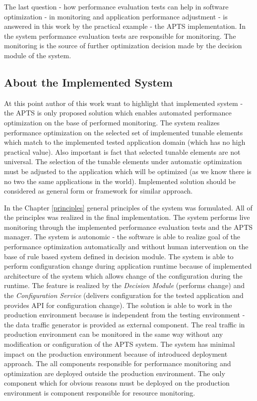 \documentclass[12pt,a4paper]{article}
\begin{document}
The last question - how performance evaluation tests can help in software optimization - in monitoring and application performance adjustment - is answered in this work by the practical example - the APTS implementation. In the system performance evaluation tests are responsible for monitoring. The monitoring is the source of further optimization decision made by the decision module of the system.  


\subsection{About the Implemented System}

At this point author of this work want to highlight that implemented system - the APTS is only proposed solution which enables automated performance optimization on the base of performed monitoring. The system realizes performance optimization on the selected set of implemented tunable elements which match to the implemented tested application domain (which has no high practical value). Also important is fact that selected tunable elements are not universal. The selection of the tunable elements under automatic optimization must be adjusted to the application which will be optimized (as we know there is no two the same applications in the world). Implemented solution should be considered as general form or framework for similar approach. 

In the Chapter \ref{principles} general principles of the system was formulated. All of the principles was realized in the final implementation. The system performs live monitoring through  the implemented performance evaluation tests and the APTS manager. The system is autonomic - the software is able to realize goal of the performance optimization automatically and without human intervention on the base of rule based system defined in decision module. The system is able to perform configuration change during application runtime because of implemented architecture of the system which allows change of the configuration during the runtime. The feature is realized by the \textit{Decision Module} (performs change) and the \textit{Configuration Service} (delivers configuration for the tested application and provides API for configuration change). The solution is able to work in the production environment because is independent from the testing environment - the data traffic generator is provided as external component. The real traffic in production environment can be monitored in the same way without any modification or configuration of the APTS system. The system has minimal impact on the production environment because of introduced deployment approach. The all components responsible for performance monitoring and optimization are deployed outside the production environment. The only component which for obvious reasons must be deployed on the production environment is component responsible for resource monitoring.  
\end{document}
